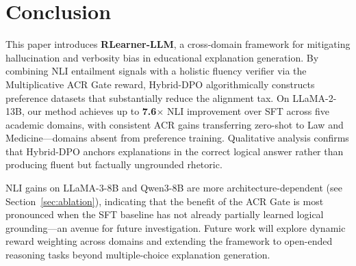\section{Conclusion}
This paper introduces \textbf{RLearner-LLM}, a cross-domain framework for mitigating hallucination and verbosity bias in educational explanation generation. By combining NLI entailment signals with a holistic fluency verifier via the Multiplicative ACR Gate reward, Hybrid-DPO algorithmically constructs preference datasets that substantially reduce the alignment tax. On LLaMA-2-13B, our method achieves up to \textbf{7.6$\times$} NLI improvement over SFT across five academic domains, with consistent ACR gains transferring zero-shot to Law and Medicine---domains absent from preference training. Qualitative analysis confirms that Hybrid-DPO anchors explanations in the correct logical answer rather than producing fluent but factually ungrounded rhetoric.

NLI gains on LLaMA-3-8B and Qwen3-8B are more architecture-dependent (see Section~\ref{sec:ablation}), indicating that the benefit of the ACR Gate is most pronounced when the SFT baseline has not already partially learned logical grounding---an avenue for future investigation. Future work will explore dynamic reward weighting across domains and extending the framework to open-ended reasoning tasks beyond multiple-choice explanation generation.
